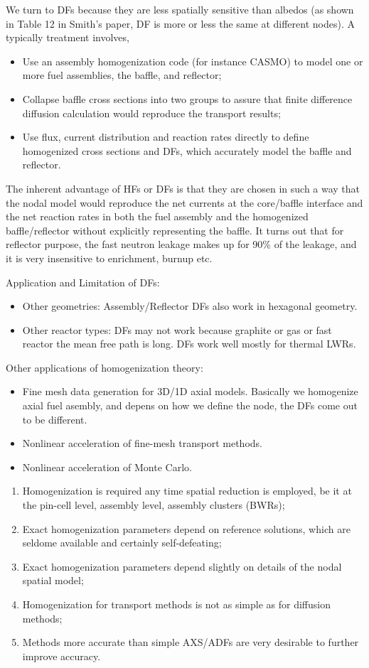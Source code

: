 \documentclass{school-22.211-notes}
\begin{document}
We turn to DFs because they are less spatially sensitive than albedos (as shown in Table 12 in Smith's paper, DF is more or less the same at different nodes). A typically treatment involves, 
\begin{itemize}
\item Use an assembly homogenization code (for instance CASMO) to model one or more fuel assemblies, the baffle, and reflector; 
\item Collapse baffle cross sections into two groups to assure that finite difference diffusion calculation would reproduce the transport results;  
\item Use flux, current distribution and reaction rates directly to define homogenized cross sections and DFs, which accurately model the baffle and reflector. 
\end{itemize}
The inherent advantage of HFs or DFs is that they are chosen in such a way that the nodal model would reproduce the net currents at the core/baffle interface and the net reaction rates in both the fuel assembly and the homogenized baffle/reflector without explicitly representing the baffle. It turns out that for reflector purpose, the fast neutron leakage makes up for 90\% of the leakage, and it is very insensitive to enrichment, burnup etc. 

Application and Limitation of DFs:
\begin{itemize}
\item Other geometries: Assembly/Reflector DFs also work in hexagonal geometry. 
\item Other reactor types: DFs may not work because graphite or gas or fast reactor the mean free path is long. DFs work well mostly for thermal LWRs. 
\end{itemize}

Other applications of homogenization theory: 
\begin{itemize}
\item Fine mesh data generation for 3D/1D axial models. Basically we homogenize axial fuel asembly, and depens on how we define the node, the DFs come out to be different. 
\item Nonlinear acceleration of fine-mesh transport methods. 
\item Nonlinear acceleration of Monte Carlo. 
\end{itemize}

\clearpage
{}
\begin{enumerate}
\item Homogenization is required any time spatial reduction is employed, be it at the pin-cell level, assembly level, assembly clusters (BWRs); 
\item Exact homogenization parameters depend on reference solutions, which are seldome available and certainly self-defeating;
\item Exact homogenization parameters depend slightly on details of the nodal spatial model;
\item Homogenization for transport methods is not as simple as for diffusion methods;
\item Methods more accurate than simple AXS/ADFs are very desirable to further improve accuracy. 
\end{enumerate}
\end{document}

